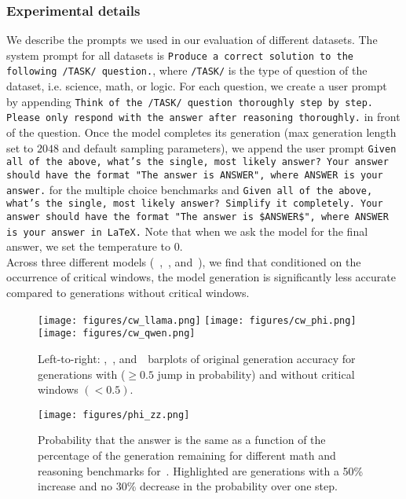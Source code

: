 \subsubsection{Experimental details}
We describe the prompts we used in our evaluation of different datasets. The system prompt for all datasets is \texttt{Produce a correct solution to the following /TASK/ question.}, where \texttt{/TASK/} is the type of question of the dataset, i.e. science, math, or logic. For each question, we create a user prompt by appending \texttt{Think of the /TASK/ question thoroughly step by step. Please only respond with the answer after reasoning thoroughly.} in front of the question. Once the model completes its generation (max generation length set to $2048$ and default sampling parameters), we append the user prompt \texttt{Given all of the above, what’s the single, most likely answer? Your answer should have the format "The answer is ANSWER", where ANSWER is your answer.} for the multiple choice benchmarks and \texttt{Given all of the above, what’s the single, most likely answer? Simplify it completely. Your answer should have the format "The answer is \$ANSWER\$", where ANSWER is your answer in LaTeX.} Note that when we ask the model for the final answer, we set the temperature to $0$. \\

Across three different models (~\llamainstruct,~\phiinstruct, and~\qweninstruct), we find that conditioned on the occurrence of critical windows, the model generation is significantly less accurate compared to generations without critical windows. 

\begin{figure}[H] 
    \centering
    \texttt{[image: figures/cw\_llama.png]}
    \texttt{[image: figures/cw\_phi.png]}
    \texttt{[image: figures/cw\_qwen.png]}
    \hfill
    \caption{Left-to-right: \llamainstruct,~\phiinstruct, and~\qweninstruct~barplots of original generation accuracy for generations with ($\geq0.5$ jump in probability) and without critical windows $(<0.5)$. }
    \label{fig:app:cw_bar}
\end{figure}



\begin{figure}[H] 
    \centering
    \texttt{[image: figures/phi\_zz.png]}
    \caption{Probability that the answer is the same as a function of the percentage of the generation remaining for different math and reasoning benchmarks for~\phiinstruct. Highlighted are generations with a 50\% increase and no 30\% decrease in the probability over one step. }
    \label{fig:app:phi_cw_benchmark}
\end{figure}

